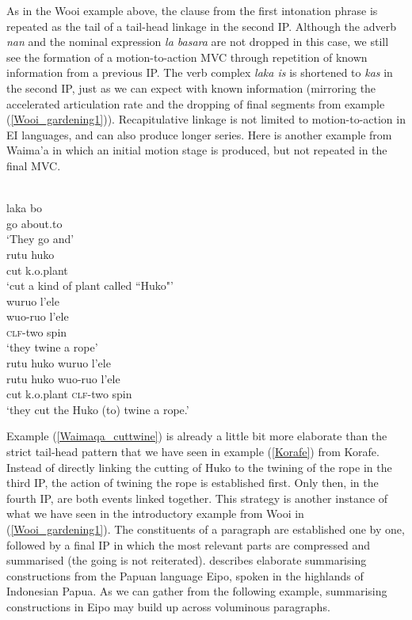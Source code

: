 As in the Wooi example above, the clause from the first intonation phrase is repeated as the tail of a tail-head linkage in the second IP. Although the adverb \textit{nan} and the nominal expression \textit{la basara} are not dropped in this case, we still see the formation of a motion-to-action MVC through repetition of known information from a previous IP. The verb complex \textit{laka is} is shortened to \textit{kas} in the second IP, just as we can expect with known information (mirroring the accelerated articulation rate and the dropping of final segments from example (\ref{Wooi_gardening1})). Recapitulative linkage is not limited to motion-to-action in EI languages, and can also produce longer series. Here is another example from Waima'a in which an initial motion stage is produced, but not repeated in the final MVC. 

\ea \label{Waimaqa_cuttwine}
\\
\ea
\gll laka bo \\
go about.to \\
\glft `They go and' \\
\ex
\gll rutu huko \\
cut k.o.plant \\
\glft `cut a kind of plant called ``Huko"' \\
\ex
\glll wuruo l'ele \\
wuo-ruo l'ele \\
\textsc{clf}-two spin \\
\glft `they twine a rope' \\
\ex
\glll rutu huko wuruo l'ele \\
rutu huko wuo-ruo l'ele \\
cut k.o.plant \textsc{clf}-two spin \\
\glft `they cut the Huko (to) twine a rope.'\\
\z
\z

Example (\ref{Waimaqa_cuttwine}) is already a little bit more elaborate than the strict tail-head pattern that we have seen in example (\ref{Korafe}) from Korafe. Instead of directly linking the cutting of Huko to the twining of the rope in the third IP, the action of twining the rope is established first. Only then, in the fourth IP, are both events linked together. This strategy is another instance of what we have seen in the introductory example from Wooi in (\ref{Wooi_gardening1}). The constituents of a paragraph are established one by one, followed by a final IP in which the most relevant parts are compressed and summarised (the going is not reiterated). \citet{heeschen1998eipo} describes elaborate summarising constructions from the Papuan language Eipo, spoken in the highlands of Indonesian Papua. As we can gather from the following example, summarising constructions in Eipo may build up across voluminous paragraphs.

